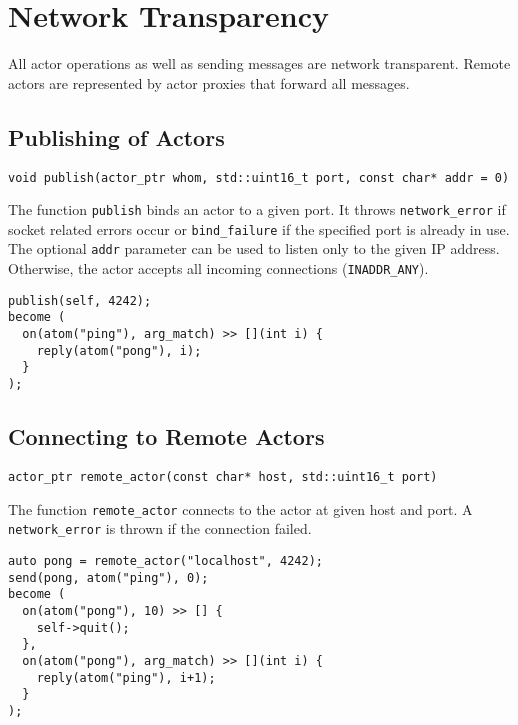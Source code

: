 \section{Network Transparency}

All actor operations as well as sending messages are network transparent.
Remote actors are represented by actor proxies that forward all messages.

\subsection{Publishing of Actors}

\begin{lstlisting}
void publish(actor_ptr whom, std::uint16_t port, const char* addr = 0)
\end{lstlisting}

The function \lstinline^publish^ binds an actor to a given port.
It throws \lstinline^network_error^ if socket related errors occur or \lstinline^bind_failure^ if the specified port is already in use.
The optional \lstinline^addr^ parameter can be used to listen only to the given IP address.
Otherwise, the actor accepts all incoming connections (\lstinline^INADDR_ANY^).

\begin{lstlisting}
publish(self, 4242);
become (
  on(atom("ping"), arg_match) >> [](int i) {
    reply(atom("pong"), i);
  }
);
\end{lstlisting}

\subsection{Connecting to Remote Actors}

\begin{lstlisting}
actor_ptr remote_actor(const char* host, std::uint16_t port)
\end{lstlisting}

The function \lstinline^remote_actor^ connects to the actor at given host and port.
A \lstinline^network_error^ is thrown if the connection failed.

\begin{lstlisting}
auto pong = remote_actor("localhost", 4242);
send(pong, atom("ping"), 0);
become (
  on(atom("pong"), 10) >> [] {
    self->quit();
  },
  on(atom("pong"), arg_match) >> [](int i) {
    reply(atom("ping"), i+1);
  }
);
\end{lstlisting}
